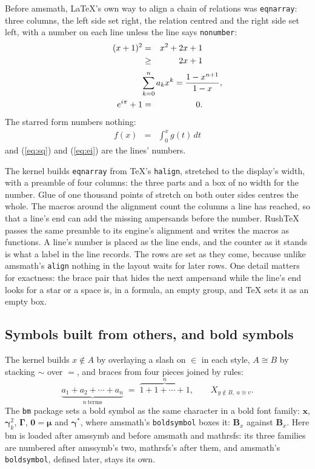 \documentclass{article}
\numberwithin{equation}{section}
\theoremstyle{definition}
\theoremstyle{remark}
\begin{document}
Before amsmath, \LaTeX's own way to align a chain of relations was \texttt{eqnarray}:
three columns, the left side set right, the relation centred and the right side set left,
with a number on each line unless the line says \texttt{nonumber}:
\begin{eqnarray}
  (x+1)^{2} & = & x^{2} + 2x + 1 \label{eq:sq}\\
            & \ge & 2x + 1 \nonumber\\[2pt]
  \lefteqn{\sum_{k=0}^{n} a_{k} x^{k} = \frac{1-x^{n+1}}{1-x},} \nonumber\\
  e^{i\pi} + 1 & = & 0. \label{eq:ei}
\end{eqnarray}
The starred form numbers nothing:
\begin{eqnarray*}
  f(x) & = & \int_{0}^{x} g(t)\,dt
\end{eqnarray*}
and (\ref{eq:sq}) and (\ref{eq:ei}) are the lines' numbers.

The kernel builds \texttt{eqnarray} from \TeX's \texttt{halign}, stretched to the
display's width, with a preamble of four columns: the three parts and a box of no width
for the number. Glue of one thousand points of stretch on both outer sides centres the
whole. The macros around the alignment count the columns a line has reached, so that a
line's end can add the missing ampersands before the number. RushTeX passes the same
preamble to its engine's alignment and writes the macros as functions. A line's number
is placed as the line ends, and the counter as it stands is what a label in the line
records. The rows are set as they come, because unlike amsmath's \texttt{align} nothing
in the layout waits for later rows. One detail matters for exactness: the brace pair
that hides the next ampersand while the line's end looks for a star or a space is, in a
formula, an empty group, and \TeX{} sets it as an empty box.

\subsection{Symbols built from others, and bold symbols}\label{sec:mathbuilt}

The kernel builds $x\notin A$ by overlaying a slash on $\in$ in each style, $A\cong B$ by
stacking $\sim$ over $=$, and braces from four pieces joined by rules:
\[
  \underbrace{a_1+a_2+\cdots+a_n}_{n\ \text{terms}} \;=\; \overbrace{1+1+\cdots+1}^{n},
  \qquad X_{y\notin B,\ u\cong v}.
\]
The \texttt{bm} package sets a bold symbol as the same character in a bold font family:
$\bm{x}$, $\bm{\gamma}_k^2$, $\bm{\Gamma}$, $\bm{0} \bm{=} \bm{\mu}$ and $\bm{\gamma^\ast}$,
where amsmath's \texttt{boldsymbol} boxes it: $\boldsymbol{B}_x$ against $\bm{B}_x$. Here
bm is loaded after amssymb and before amsmath and mathrsfs: its three families are numbered
after amssymb's two, mathrsfs's after them, and amsmath's \texttt{boldsymbol}, defined
later, stays its own.
\end{document}
